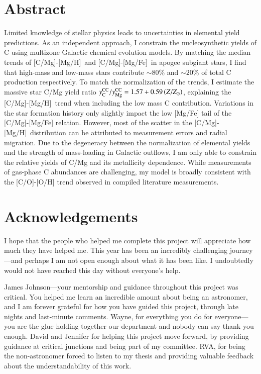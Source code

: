 \documentclass[12pt,oneside,letterpaper]{report}
\newcommand{\caah}{[C/Mg]-[Mg/H]}
\newcommand{\caafe}{[C/Mg]-[Mg/Fe]}
\newcommand{\Ycc}{\ensuremath{y_{\rm C}^{\rm CC}}}
\newcommand{\Yoc}{\ensuremath{y_{\rm Mg}^{\rm CC}}}
\newcommand{\about}[1]{${\sim} #1$}
\begin{document}
\chapter*{Abstract}
Limited knowledge of stellar physics leads to uncertainties in elemental yield predictions.
As an independent approach, I constrain the nucleosynthetic yields of C using multizone Galactic chemical evolution models.
By matching the median trends of \caah\ and \caafe\ in  {\sc apogee} subgiant stars, I find that high-mass and low-mass stars contribute \about{80\%} and \about{20\%} of total C production respectively.
% 
To match the normalization of the trends, I estimate the massive star C/Mg yield ratio $\Ycc/\Yoc = 1.57 + 0.59 \left(Z/Z_\odot\right)$,  explaining the \caah\ trend when including the low mass C contribution.
%
Variations in the star formation history only slightly impact the low [Mg/Fe] tail of the [C/Mg]-[Mg/Fe] relation. However, most of the scatter in the \caah\ distribution can be attributed to measurement errors and radial migration. 
% 
Due to the degeneracy between the normalization of elemental yields and the strength of mass-loading in Galactic outflows, I am only able to constrain the relative yields of C/Mg and its metallicity dependence. While measurements of gas-phase C abundances are challenging, my model is broadly consistent with the [C/O]-[O/H] trend observed in compiled literature measurements.





\chapter*{Acknowledgements}


I hope that the people who helped me complete this project will appreciate how much they have helped me. This year has been an incredibly challenging journey---and perhaps I am not open enough about what it has been like. I undoubtedly would not have reached this day without everyone's help.

James Johnson---your mentorship and guidance throughout this project was critical. 
You helped me learn an incredible amount about being an astronomer, and I am forever grateful for how you have guided this project, through late nights and last-minute comments.  Wayne, for everything you do for everyone---you are the glue holding together our department and nobody can say thank you enough. 
David and Jennifer for helping this project move forward, by providing guidance at critical junctions and being part of my committee. RVA, for being the non-astronomer forced to listen to my thesis and providing valuable feedback about the understandability of this work.
\end{document}
